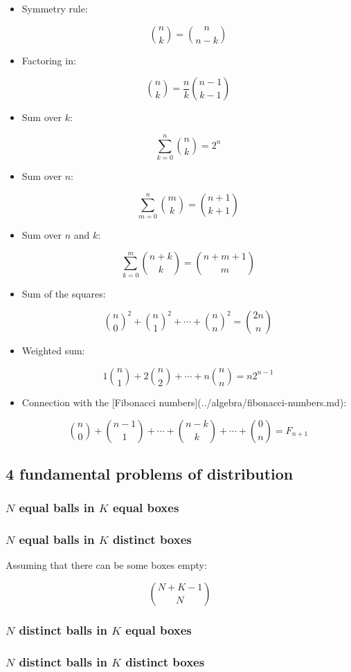 \begin{itemize}
    \item Symmetry rule:

    \[ \binom n k = \binom n {n-k} \]

    \item Factoring in:

    \[ \binom n k = \frac n k \binom {n-1} {k-1} \]

    \item Sum over $k$:

    \[ \sum_{k = 0}^n \binom n k = 2 ^ n \]

    \item Sum over $n$:

    \[ \sum_{m = 0}^n \binom m k = \binom {n + 1} {k + 1} \]

    \item Sum over $n$ and $k$:

    \[ \sum_{k = 0}^m  \binom {n + k} k = \binom {n + m + 1} m \]

    \item Sum of the squares:

    \[ {\binom n 0}^2 + {\binom n 1}^2 + \cdots + {\binom n n}^2 = \binom {2n} n \]

    \item Weighted sum:

    \[ 1 \binom n 1 + 2 \binom n 2 + \cdots + n \binom n n = n 2^{n-1} \]

    \item Connection with the [Fibonacci numbers](../algebra/fibonacci-numbers.md):

    \[ \binom n 0 + \binom {n-1} 1 + \cdots + \binom {n-k} k + \cdots + \binom 0 n = F_{n+1} \]

\end{itemize}

\subsection{4 fundamental problems of distribution}

\subsubsection{$N$ equal balls in $K$ equal boxes}

\subsubsection{$N$ equal balls in $K$ distinct boxes}

Assuming that there can be some boxes empty:

$$
\binom{N + K -1}{N}
$$

\subsubsection{$N$ distinct balls in $K$ equal boxes}

\subsubsection{$N$ distinct balls in $K$ distinct boxes}

